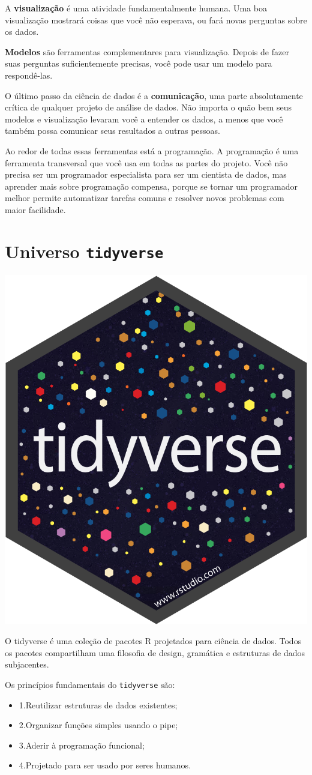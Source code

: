 \documentclass[a4paper]{book}
\providecommand{\tightlist}{%
  \setlength{\itemsep}{0pt}\setlength{\parskip}{0pt}}
\begin{document}
A \textbf{visualização} é uma atividade fundamentalmente humana. Uma boa visualização mostrará coisas que você não esperava, ou fará novas perguntas sobre os dados.

\textbf{Modelos} são ferramentas complementares para visualização. Depois de fazer suas perguntas suficientemente precisas, você pode usar um modelo para respondê-las.

O último passo da ciência de dados é a \textbf{comunicação}, uma parte absolutamente crítica de qualquer projeto de análise de dados. Não importa o quão bem seus modelos e visualização levaram você a entender os dados, a menos que você também possa comunicar seus resultados a outras pessoas.

Ao redor de todas essas ferramentas está a programação. A programação é uma ferramenta transversal que você usa em todas as partes do projeto. Você não precisa ser um programador especialista para ser um cientista de dados, mas aprender mais sobre programação compensa, porque se tornar um programador melhor permite automatizar tarefas comuns e resolver novos problemas com maior facilidade.

\hypertarget{universo-tidyverse}{%
\section{\texorpdfstring{Universo \texttt{tidyverse}}{Universo tidyverse}}\label{universo-tidyverse}}

\begin{center}\includegraphics[width=0.25\linewidth]{imagens/hex-tidyverse} \end{center}

O tidyverse é uma coleção de pacotes R projetados para ciência de dados. Todos os pacotes compartilham uma filosofia de design, gramática e estruturas de dados subjacentes.

Os princípios fundamentais do \texttt{tidyverse} são:

\begin{itemize}
\tightlist
\item
  1.Reutilizar estruturas de dados existentes;
\item
  2.Organizar funções simples usando o pipe;
\item
  3.Aderir à programação funcional;
\item
  4.Projetado para ser usado por seres humanos.
\end{itemize}
\end{document}
